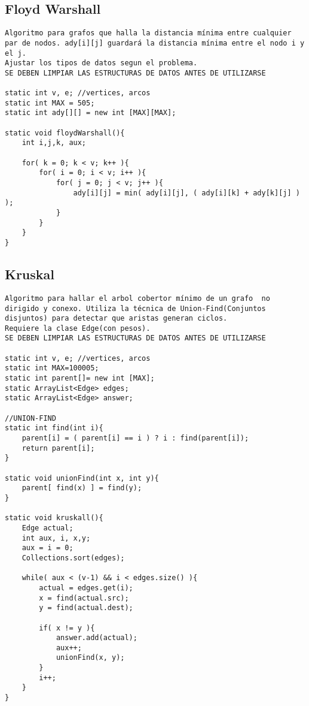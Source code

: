 \documentclass[10pt,letterpaper,twocolumn,twosided]{article}
\begin{document}
\subsection{Floyd Warshall}
\begin{lstlisting}
Algoritmo para grafos que halla la distancia mínima entre cualquier par de nodos. ady[i][j] guardará la distancia mínima entre el nodo i y el j.
Ajustar los tipos de datos segun el problema.
SE DEBEN LIMPIAR LAS ESTRUCTURAS DE DATOS ANTES DE UTILIZARSE

static int v, e; //vertices, arcos
static int MAX = 505;     
static int ady[][] = new int [MAX][MAX];

static void floydWarshall(){
    int i,j,k, aux;
    
    for( k = 0; k < v; k++ ){
        for( i = 0; i < v; i++ ){
            for( j = 0; j < v; j++ ){
                ady[i][j] = min( ady[i][j], ( ady[i][k] + ady[k][j] ) );
            }
        }
    }
}
\end{lstlisting}

\subsection{Kruskal}
\begin{lstlisting}
Algoritmo para hallar el arbol cobertor mínimo de un grafo  no dirigido y conexo. Utiliza la técnica de Union-Find(Conjuntos disjuntos) para detectar que aristas generan ciclos.
Requiere la clase Edge(con pesos).
SE DEBEN LIMPIAR LAS ESTRUCTURAS DE DATOS ANTES DE UTILIZARSE

static int v, e; //vertices, arcos
static int MAX=100005;     
static int parent[]= new int [MAX];
static ArrayList<Edge> edges;
static ArrayList<Edge> answer;

//UNION-FIND   
static int find(int i){
    parent[i] = ( parent[i] == i ) ? i : find(parent[i]);
    return parent[i];
}

static void unionFind(int x, int y){
    parent[ find(x) ] = find(y);
}

static void kruskall(){
    Edge actual;
    int aux, i, x,y;
    aux = i = 0;
    Collections.sort(edges);
        
    while( aux < (v-1) && i < edges.size() ){
        actual = edges.get(i);
        x = find(actual.src);
        y = find(actual.dest);

        if( x != y ){
            answer.add(actual);
            aux++;
            unionFind(x, y);
        }
        i++;
    }
}
\end{lstlisting}
\end{document}
